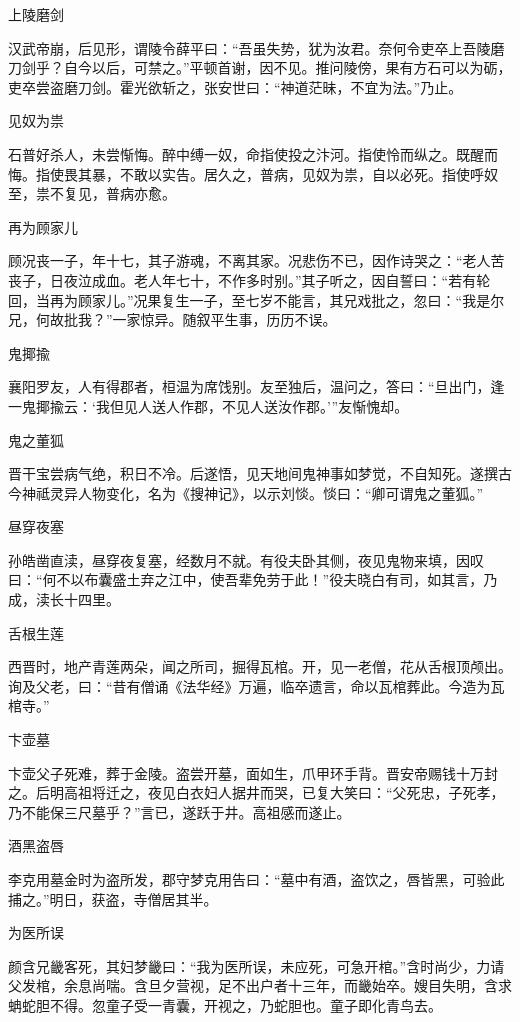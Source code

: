 \documentclass[a4paper,12pt,UTF8,twoside]{ctexbook}
\begin{document}
    上陵磨剑
    
    汉武帝崩，后见形，谓陵令薛平曰：“吾虽失势，犹为汝君。奈何令吏卒上吾陵磨刀剑乎？自今以后，可禁之。”平顿首谢，因不见。推问陵傍，果有方石可以为砺，吏卒尝盗磨刀剑。霍光欲斩之，张安世曰：“神道茫昧，不宜为法。”乃止。
    
    见奴为祟
    
    石普好杀人，未尝惭悔。醉中缚一奴，命指使投之汴河。指使怜而纵之。既醒而悔。指使畏其暴，不敢以实告。居久之，普病，见奴为祟，自以必死。指使呼奴至，祟不复见，普病亦愈。
    
    再为顾家儿
    
    顾况丧一子，年十七，其子游魂，不离其家。况悲伤不已，因作诗哭之：“老人苦丧子，日夜泣成血。老人年七十，不作多时别。”其子听之，因自誓曰：“若有轮回，当再为顾家儿。”况果复生一子，至七岁不能言，其兄戏批之，忽曰：“我是尔兄，何故批我？”一家惊异。随叙平生事，历历不误。
    
    鬼揶揄
    
    襄阳罗友，人有得郡者，桓温为席饯别。友至独后，温问之，答曰：“旦出门，逢一鬼揶揄云：‘我但见人送人作郡，不见人送汝作郡。’”友惭愧却。
    
    鬼之董狐
    
    晋干宝尝病气绝，积日不冷。后遂悟，见天地间鬼神事如梦觉，不自知死。遂撰古今神祗灵异人物变化，名为《搜神记》，以示刘惔。惔曰：“卿可谓鬼之董狐。”
    
    昼穿夜塞
    
    孙皓凿直渎，昼穿夜复塞，经数月不就。有役夫卧其侧，夜见鬼物来填，因叹曰：“何不以布囊盛土弃之江中，使吾辈免劳于此！”役夫晓白有司，如其言，乃成，渎长十四里。
    
    舌根生莲
    
    西晋时，地产青莲两朵，闻之所司，掘得瓦棺。开，见一老僧，花从舌根顶颅出。询及父老，曰：“昔有僧诵《法华经》万遍，临卒遗言，命以瓦棺葬此。今造为瓦棺寺。”
    
    卞壶墓
    
    卞壶父子死难，葬于金陵。盗尝开墓，面如生，爪甲环手背。晋安帝赐钱十万封之。后明高祖将迁之，夜见白衣妇人据井而哭，已复大笑曰：“父死忠，子死孝，乃不能保三尺墓乎？”言已，遂跃于井。高祖感而遂止。
    
    酒黑盗唇
    
    李克用墓金时为盗所发，郡守梦克用告曰：“墓中有酒，盗饮之，唇皆黑，可验此捕之。”明日，获盗，寺僧居其半。
    
    为医所误
    
    颜含兄畿客死，其妇梦畿曰：“我为医所误，未应死，可急开棺。”含时尚少，力请父发棺，余息尚喘。含旦夕营视，足不出户者十三年，而畿始卒。嫂目失明，含求蚺蛇胆不得。忽童子受一青囊，开视之，乃蛇胆也。童子即化青鸟去。
    
\end{document}
